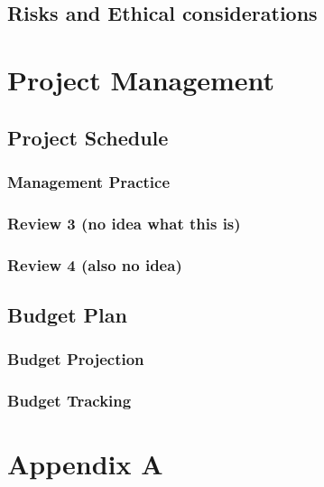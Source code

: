 \documentclass[12pt,oneside,letterpaper,english]{article}
\begin{document}
\subsection{Risks and Ethical considerations}

\section{Project Management}
\subsection{Project Schedule}
\subsubsection{Management Practice}
\subsubsection{Review 3 (no idea what this is)}
\subsubsection{Review 4 (also no idea)}
\subsection{Budget Plan}
\subsubsection{Budget Projection}
\subsubsection{Budget Tracking}




\newpage
{}
 


\newpage
\section{Appendix A} \label{ch6}

\label{endOfDoc}
\end{document}
